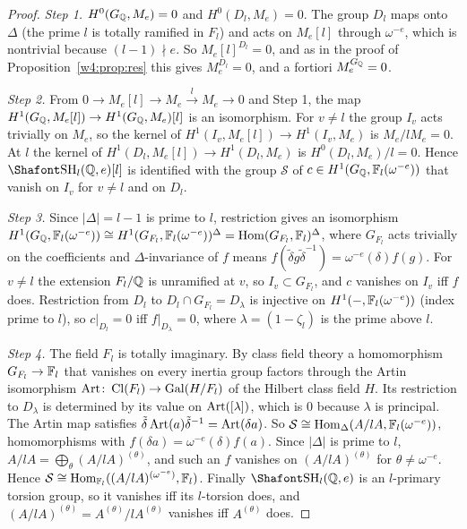 \begin{proof}
\emph{Step 1.} $H^0(G_\mathbb Q,M_e)=0$ and $H^0(D_l,M_e)=0$. The group $D_l$ maps onto $\Delta$ (the prime $l$ is totally ramified in $F_l$) and acts on $M_e[l]$ through $\omega^{-e}$, which is nontrivial because $(l-1)\nmid e$. So $M_e[l]^{D_l}=0$, and as in the proof of Proposition~\ref{w4:prop:res} this gives $M_e^{D_l}=0$, and a fortiori $M_e^{G_\mathbb Q}=0$.

\emph{Step 2.} From $0\to M_e[l]\to M_e\xrightarrow{l}M_e\to0$ and Step 1, the map $H^1(G_\mathbb Q,M_e[l])\to H^1(G_\mathbb Q,M_e)[l]$ is an isomorphism. For $v\ne l$ the group $I_v$ acts trivially on $M_e$, so the kernel of $H^1(I_v,M_e[l])\to H^1(I_v,M_e)$ is $M_e/lM_e=0$. At $l$ the kernel of $H^1(D_l,M_e[l])\to H^1(D_l,M_e)$ is $H^0(D_l,M_e)/l=0$. Hence $\Sha_l(\Q,e)[l]$ is identified with the group $\mathcal S$ of $c\in H^1(G_\mathbb Q,\mathbb F_l(\omega^{-e}))$ that vanish on $I_v$ for $v\ne l$ and on $D_l$.

\emph{Step 3.} Since $|\Delta|=l-1$ is prime to $l$, restriction gives an isomorphism $H^1(G_\mathbb Q,\mathbb F_l(\omega^{-e}))\cong H^1(G_{F_l},\mathbb F_l(\omega^{-e}))^\Delta=\operatorname{Hom}(G_{F_l},\mathbb F_l)^{\Delta}$, where $G_{F_l}$ acts trivially on the coefficients and $\Delta$-invariance of $f$ means $f(\tilde\delta g\tilde\delta^{-1})=\omega^{-e}(\delta)f(g)$. For $v\ne l$ the extension $F_l/\mathbb Q$ is unramified at $v$, so $I_v\subset G_{F_l}$, and $c$ vanishes on $I_v$ iff $f$ does. Restriction from $D_l$ to $D_l\cap G_{F_l}=D_\lambda$ is injective on $H^1(-,\mathbb F_l(\omega^{-e}))$ (index prime to $l$), so $c|_{D_l}=0$ iff $f|_{D_\lambda}=0$, where $\lambda=(1-\zeta_l)$ is the prime above $l$.

\emph{Step 4.} The field $F_l$ is totally imaginary. By class field theory a homomorphism $G_{F_l}\to\mathbb F_l$ that vanishes on every inertia group factors through the Artin isomorphism $\operatorname{Art}\colon\operatorname{Cl}(F_l)\to\operatorname{Gal}(H/F_l)$ of the Hilbert class field $H$. Its restriction to $D_\lambda$ is determined by its value on $\operatorname{Art}([\lambda])$, which is $0$ because $\lambda$ is principal. The Artin map satisfies $\tilde\delta\operatorname{Art}(a)\tilde\delta^{-1}=\operatorname{Art}(\delta a)$. So $\mathcal S\cong\operatorname{Hom}_\Delta(A/lA,\mathbb F_l(\omega^{-e}))$, homomorphisms with $f(\delta a)=\omega^{-e}(\delta)f(a)$. Since $|\Delta|$ is prime to $l$, $A/lA=\bigoplus_\theta(A/lA)^{(\theta)}$, and such an $f$ vanishes on $(A/lA)^{(\theta)}$ for $\theta\ne\omega^{-e}$. Hence $\mathcal S\cong\operatorname{Hom}_{\mathbb F_l}((A/lA)^{(\omega^{-e})},\mathbb F_l)$. Finally $\Sha_l(\Q,e)$ is an $l$-primary torsion group, so it vanishes iff its $l$-torsion does, and $(A/lA)^{(\theta)}=A^{(\theta)}/lA^{(\theta)}$ vanishes iff $A^{(\theta)}$ does.
\end{proof}

